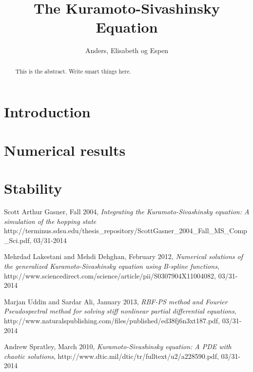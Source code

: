 \documentclass[10pt,a4paper]{article}
\begin{document}
\title{The Kuramoto-Sivashinsky Equation}
\author{Anders, Elisabeth og Espen}

\maketitle



\begin{abstract}
This is the abstract. Write smart things here.
\end{abstract}



\section*{Introduction}


\section*{Numerical results}


\section*{Stability}






\begin{thebibliography}{9}

Scott Arthur Gasner, Fall 2004,
\emph{Integrating the Kuramoto-Sivashinsky equation: A simulation of the hopping state}
http://terminus.sdsu.edu/thesis\_repository/ScottGasner\_2004\_Fall\_MS\_Comp\_Sci.pdf, 03/31-2014

Mehrdad Lakestani and Mehdi Dehghan, February 2012,
\emph{Numerical solutions of the generalized Kuramoto-Sivashinsky equation using B-spline functions},
http://www.sciencedirect.com/science/article/pii/S0307904X11004082, 03/31-2014

Marjan Uddin and Sardar Ali, January 2013,
\emph{RBF-PS method and Fourier Pseudospectral method for solving stiff 
nonlinear partial differential equations},
http://www.naturalspublishing.com/files/published/ed38fj6n3xt187.pdf, 03/31-2014

Andrew Spratley, March 2010,
\emph{Kuramoto-Sivashinsky equation: A PDE with chaotic solutions},
http://www.dtic.mil/dtic/tr/fulltext/u2/a228590.pdf, 03/31-2014

\end{thebibliography}
\end{document}
